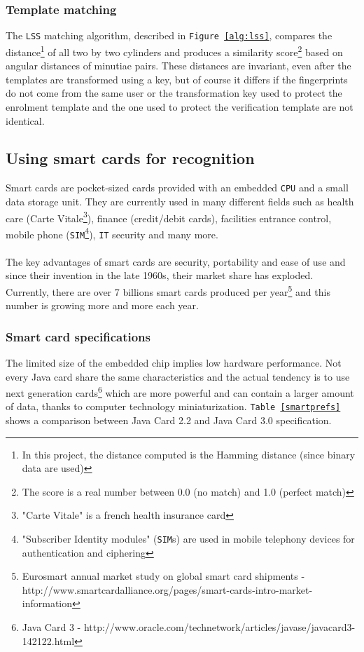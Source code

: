 \documentclass[a4paper,12pt]{article}
\begin{document}
\subsubsection{Template matching}
The \texttt{LSS} matching algorithm, described in \texttt{Figure \ref{alg:lss}}, compares the distance\footnote{In this project, the  distance computed is the Hamming distance (since binary data are used)} of all two by two cylinders and produces a similarity score\footnote{The score is a real number between 0.0 (no match) and 1.0 (perfect match)} based on angular distances of minutiae pairs. These distances are invariant, even after the templates are transformed using a key, but of course it differs if the fingerprints do not come from the same user or the transformation key used to protect the enrolment template and the one used to protect the verification template are not identical.\\
\subsection{Using smart cards for recognition}
Smart cards are pocket-sized cards provided with an embedded \texttt{CPU} and a small data storage unit. They are currently used in many different fields such as health care (Carte Vitale\footnote{"Carte Vitale" is a french health insurance card}), finance (credit/debit cards), facilities entrance control, mobile phone (\texttt{SIM}\footnote{"Subscriber Identity modules" (\texttt{SIM}s) are used in mobile telephony devices for authentication and ciphering}), \texttt{IT} security and many more.
\\\\
The key advantages of smart cards are security, portability and ease of use and since their invention in the late 1960s, their market share has exploded. Currently, there are over 7 billions smart cards produced per year\footnote{Eurosmart annual market study on global smart card shipments - http://www.smartcardalliance.org/pages/smart-cards-intro-market-information} and this number is growing more and more each year.
\subsubsection{Smart card specifications}
The limited size of the embedded chip implies low hardware performance. Not every Java card share the same characteristics and the actual tendency is to use next generation cards\footnote{Java Card 3 - http://www.oracle.com/technetwork/articles/javase/javacard3-142122.html} which are more powerful and can contain a larger amount of data, thanks to computer technology miniaturization. \texttt{Table \ref{smartprefs}} shows a comparison between Java Card 2.2 and Java Card 3.0 specification.
\end{document}
